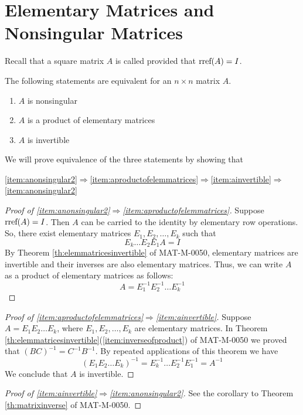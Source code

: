 \documentclass{ximera}
\begin{document}
 
\section*{Elementary Matrices and Nonsingular Matrices} 

Recall that a square matrix $A$ is called  provided that $\textnormal{rref}(A)=I$.

\begin{theorem}
The following statements are equivalent for an $n\times n$ matrix $A$.
\begin{enumerate}
\item\label{item:anonsingular2} $A$ is nonsingular
\item\label{item:aproductofelemmatrices} $A$ is a product of elementary matrices
\item\label{item:ainvertible} $A$ is invertible
\end{enumerate}
\end{theorem}
We will prove equivalence of the three statements by showing that
\begin{center}
\ref{item:anonsingular2}$\Rightarrow$\ref{item:aproductofelemmatrices}$\Rightarrow$\ref{item:ainvertible}$\Rightarrow$\ref{item:anonsingular2}
\end{center}
\begin{proof}[Proof of \ref{item:anonsingular2}$\Rightarrow$\ref{item:aproductofelemmatrices}]
Suppose $\textnormal{rref}(A)=I$.  Then $A$ can be carried to the identity by elementary row operations.  So, there exist elementary matrices $E_1, E_2, \ldots ,E_k$ such that 
$$E_k\ldots E_2E_1A=I$$
By Theorem \ref{th:elemmatricesinvertible} of MAT-M-0050, elementary matrices are invertible and their inverses are also elementary matrices.  Thus, we can write $A$ as a product of elementary matrices as follows:
$$A=E_1^{-1}E_2^{-1}\ldots E_k^{-1}$$
\end{proof}
\begin{proof}[Proof of \ref{item:aproductofelemmatrices}$\Rightarrow$\ref{item:ainvertible}]
Suppose $A=E_1E_2\ldots E_k$, where $E_1, E_2, \ldots , E_k$ are elementary matrices.  In Theorem \ref{th:elemmatricesinvertible}(\ref{item:inverseofproduct}) of MAT-M-0050 we proved that $(BC)^{-1} = C^{-1} B^{-1}$.  By repeated applications of this theorem we have
$$(E_1E_2\ldots E_k)^{-1}=E_k^{-1}\ldots E_2^{-1}E_1^{-1}=A^{-1}$$
We conclude that $A$ is invertible.
\end{proof}
\begin{proof}[Proof of \ref{item:ainvertible}$\Rightarrow$\ref{item:anonsingular2}]
See the corollary to Theorem \ref{th:matrixinverse} of MAT-M-0050.
\end{proof}
\end{document}
